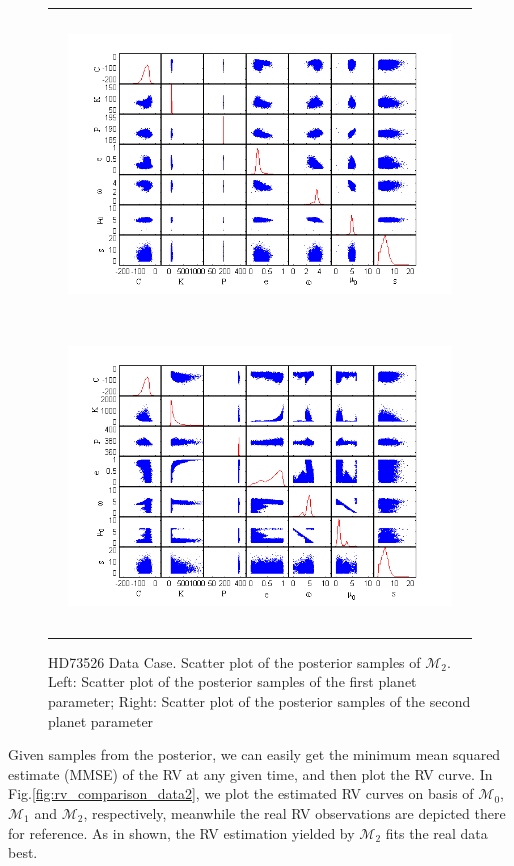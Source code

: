 \documentclass[aoas]{imsart}
\begin{document}
\begin{figure}[!htb]
\begin{tabular}{c}
\centerline{\includegraphics[width=4in,height=3.2in]{Fig/scatter1_2p_data2.png}\includegraphics[width=4in,height=3.2in]{Fig/scatter2_2p_data2.png}}\\
\end{tabular}
\caption{HD73526 \cite{tinney20062} Data Case. Scatter plot of the
posterior samples of $\mathcal{M}_2$. Left: Scatter plot of the
posterior samples of the first planet parameter; Right: Scatter plot
of the posterior samples of the second planet parameter}
\label{fig:scatter_2p_data2}
\end{figure}


Given samples from the posterior, we can easily get the minimum mean
squared estimate (MMSE) of the RV at any given time, and then plot
the RV curve. In Fig.\ref{fig:rv_comparison_data2}, we plot the
estimated RV curves on basis of $\mathcal{M}_0$, $\mathcal{M}_1$ and
$\mathcal{M}_2$, respectively, meanwhile the real RV observations
are depicted there for reference. As in shown, the RV estimation
yielded by $\mathcal{M}_2$ fits the real data best.
\end{document}
